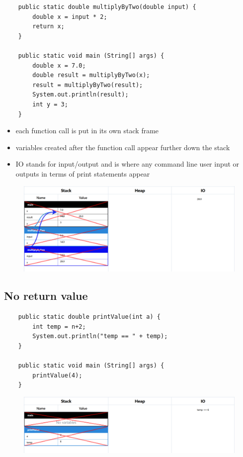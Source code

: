 \documentclass{article}
\begin{document}
\begin{verbatim}
	public static double multiplyByTwo(double input) {
	    double x = input * 2;
	    return x;
	}

	public static void main (String[] args) {
	    double x = 7.0;
	    double result = multiplyByTwo(x);
	    result = multiplyByTwo(result);
	    System.out.println(result);
	    int y = 3;
	}
\end{verbatim}

\begin{itemize}
	\item each function call is put in its own stack frame
	\item variables created after the function call appear further down the stack
	\item IO stands for input/output and is where any command line user input or
	outputs in terms of print statements appear
\end{itemize}

\begin{figure}[H]
	\centering
	\includegraphics{functionReturn.png}
\end{figure}

\pagebreak

\subsection{No return value}

\begin{verbatim}
	public static double printValue(int a) {
	    int temp = n+2;
	    System.out.println("temp == " + temp);
	}

	public static void main (String[] args) {
	    printValue(4);
	}
\end{verbatim}

\begin{figure}[H]
	\centering
	\includegraphics{functionNoReturn.png}
\end{figure}
\end{document}
